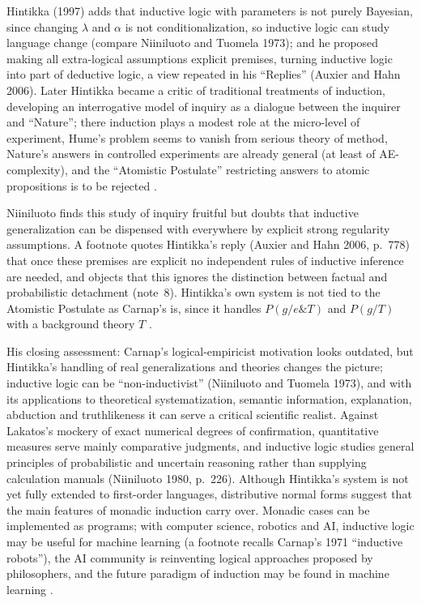 Hintikka (1997) adds that inductive logic with parameters is not purely
Bayesian, since changing \(\lambda\) and \(\alpha\) is not conditionalization,
so inductive logic can study language change (compare Niiniluoto and
Tuomela 1973); and he proposed making all
extra-logical assumptions explicit premises, turning inductive logic into
part of deductive logic, a view repeated in his ``Replies'' (Auxier and
Hahn 2006). Later Hintikka became a critic of traditional treatments of
induction, developing an interrogative model of inquiry as a dialogue
between the inquirer and ``Nature''; there induction plays a modest role at
the micro-level of experiment, Hume's problem seems to vanish from serious
theory of method, Nature's answers in controlled experiments are already
general (at least of AE-complexity), and the ``Atomistic Postulate''
restricting answers to atomic propositions is to be rejected
\cite[pp.~350--351]{Niiniluoto2011HintikkaProgramReading}.

Niiniluoto finds this study of inquiry fruitful but doubts that inductive
generalization can be dispensed with everywhere by explicit strong
regularity assumptions. A footnote quotes Hintikka's reply (Auxier and Hahn
2006, p.~778) that once these premises are explicit no independent rules
of inductive inference are needed, and objects that this ignores the
distinction between factual and probabilistic detachment (note~8).
Hintikka's own system is not tied to the Atomistic Postulate as Carnap's
is, since it handles \(P(g/e\&T)\) and \(P(g/T)\) with a background theory
\(T\) \cite[p.~351 and n.~13]{Niiniluoto2011HintikkaProgramReading}.

His closing assessment: Carnap's logical-empiricist motivation looks
outdated, but Hintikka's handling of real generalizations and theories
changes the picture; inductive logic can be ``non-inductivist'' (Niiniluoto
and Tuomela 1973), and with its applications to theoretical
systematization, semantic information, explanation, abduction and
truthlikeness it can serve a critical scientific realist. Against Lakatos's
mockery of exact numerical degrees of confirmation, quantitative measures
serve mainly comparative judgments, and inductive logic studies general
principles of probabilistic and uncertain reasoning rather than supplying
calculation manuals (Niiniluoto 1980, p.~226). Although Hintikka's system is
not yet fully extended to first-order languages, distributive normal forms
suggest that the main features of monadic induction carry over. Monadic
cases can be implemented as programs; with computer science, robotics and
AI, inductive logic may be useful for machine learning (a footnote recalls
Carnap's 1971 ``inductive robots''), the AI community is reinventing logical
approaches proposed by philosophers, and the future paradigm of induction
may be found in machine learning
\cite[pp.~351--352 and n.~14]{Niiniluoto2011HintikkaProgramReading}.

